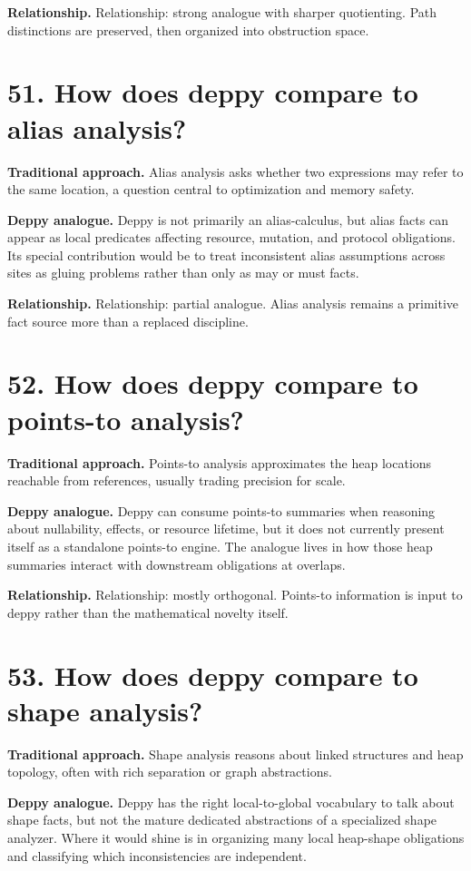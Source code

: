 \documentclass[11pt,openany]{book}
\begin{document}
\textbf{Relationship.} Relationship: strong analogue with sharper quotienting. Path distinctions are preserved, then organized into obstruction space.

\section*{51. How does deppy compare to alias analysis?}
\textbf{Traditional approach.} Alias analysis asks whether two expressions may refer to the same location, a question central to optimization and memory safety.

\textbf{Deppy analogue.} Deppy is not primarily an alias-calculus, but alias facts can appear as local predicates affecting resource, mutation, and protocol obligations. Its special contribution would be to treat inconsistent alias assumptions across sites as gluing problems rather than only as may or must facts.

\textbf{Relationship.} Relationship: partial analogue. Alias analysis remains a primitive fact source more than a replaced discipline.

\section*{52. How does deppy compare to points-to analysis?}
\textbf{Traditional approach.} Points-to analysis approximates the heap locations reachable from references, usually trading precision for scale.

\textbf{Deppy analogue.} Deppy can consume points-to summaries when reasoning about nullability, effects, or resource lifetime, but it does not currently present itself as a standalone points-to engine. The analogue lives in how those heap summaries interact with downstream obligations at overlaps.

\textbf{Relationship.} Relationship: mostly orthogonal. Points-to information is input to deppy rather than the mathematical novelty itself.

\section*{53. How does deppy compare to shape analysis?}
\textbf{Traditional approach.} Shape analysis reasons about linked structures and heap topology, often with rich separation or graph abstractions.

\textbf{Deppy analogue.} Deppy has the right local-to-global vocabulary to talk about shape facts, but not the mature dedicated abstractions of a specialized shape analyzer. Where it would shine is in organizing many local heap-shape obligations and classifying which inconsistencies are independent.
\end{document}
